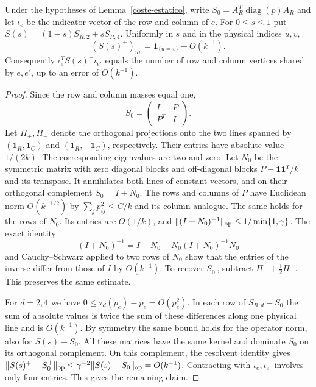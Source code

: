 \begin{lema}\label{coste-inversa}
Under the hypotheses of Lemma~\ref{coste-estatico}, write $S_0=A_R^T\operatorname{diag}(p)A_R$
and let $\iota_e$ be the indicator vector of the row and column of $e$.
For $0\le s\le1$ put $S(s)=(1-s)S_{R,2}+sS_{R,4}$. Uniformly in $s$ and in the physical indices
$u,v$,
\[
 (S(s)^+)_{uv}=\mathbf1_{\{u=v\}}+O(k^{-1}).
\]
Consequently $\iota_e^TS(s)^+\iota_{e'}$ equals the number of row and column vertices shared
by $e,e'$, up to an error of $O(k^{-1})$.
\end{lema}
\begin{proof}
Since the row and column masses equal one,
\[
 S_0=\begin{pmatrix}I&P\\P^T&I\end{pmatrix}.
\]
Let $\Pi_+,\Pi_-$ denote the orthogonal projections onto the two lines spanned by
$(\mathbf1_R,\mathbf1_C)$ and $(\mathbf1_R,-\mathbf1_C)$, respectively. Their entries have absolute
value $1/(2k)$. The corresponding eigenvalues are two and zero. Let $N_0$ be the symmetric matrix
with zero diagonal blocks and off-diagonal blocks $P-\mathbf1\mathbf1^T/k$ and its transpose.
It annihilates both lines of constant vectors, and on their orthogonal complement $S_0=I+N_0$.
The rows and columns of $P$ have Euclidean norm $O(k^{-1/2})$ by $\sum_jp_{ij}^2\le C/k$ and its
column analogue. The same holds for the rows of $N_0$. Its entries are $O(1/k)$, and
$\|(I+N_0)^{-1}\|_{\rm op}\le1/\min\{1,\gamma\}$. The exact identity
\[
 (I+N_0)^{-1}= I-N_0+N_0(I+N_0)^{-1}N_0
\]
and Cauchy--Schwarz applied to two rows of $N_0$ show that the entries of the inverse differ from
those of $I$ by $O(k^{-1})$. To recover $S_0^+$, subtract $\Pi_-+\tfrac12\Pi_+$. This preserves the
same estimate.

For $d=2,4$ we have $0\le\tau_d(p_e)-p_e=O(p_e^2)$. In each row of $S_{R,d}-S_0$ the sum of
absolute values is twice the sum of these differences along one physical line and is $O(k^{-1})$.
By symmetry the same bound holds for the operator norm, also for $S(s)-S_0$. All these matrices
have the same kernel and dominate $S_0$ on its orthogonal complement. On this complement, the
resolvent identity gives
$\|S(s)^+-S_0^+\|_{\rm op}\le\gamma^{-2}\|S(s)-S_0\|_{\rm op}=O(k^{-1})$.
Contracting with $\iota_e,\iota_{e'}$ involves only four entries. This gives the remaining claim.
\end{proof}
